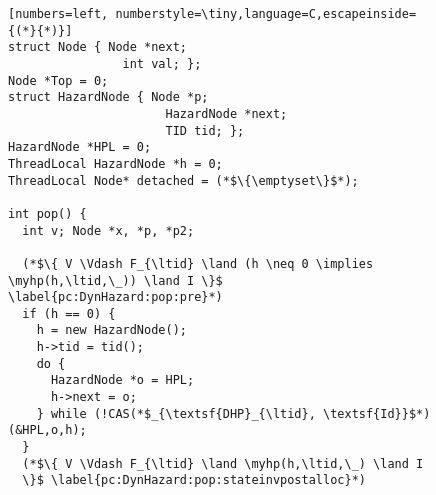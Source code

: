 \begin{figure}[p]
{\figfontsize
\begin{lstlisting}[numbers=left, numberstyle=\tiny,language=C,escapeinside={(*}{*)}]
struct Node { Node *next;
                int val; };
Node *Top = 0;
struct HazardNode { Node *p;
                      HazardNode *next;  
                      TID tid; };
HazardNode *HPL = 0;
ThreadLocal HazardNode *h = 0; 
ThreadLocal Node* detached = (*$\{\emptyset\}$*);

int pop() {
  int v; Node *x, *p, *p2;  

  (*$\{ V \Vdash F_{\ltid} \land (h \neq 0 \implies \myhp(h,\ltid,\_)) \land I \}$ \label{pc:DynHazard:pop:pre}*) 
  if (h == 0) {
    h = new HazardNode();
    h->tid = tid();
    do {
      HazardNode *o = HPL;
      h->next = o;
    } while (!CAS(*$_{\textsf{DHP}_{\ltid}, \textsf{Id}}$*)(&HPL,o,h);
  }
  (*$\{ V \Vdash F_{\ltid} \land \myhp(h,\ltid,\_) \land I
  \}$ \label{pc:DynHazard:pop:stateinvpostalloc}*) 


\end{lstlisting}}
\end{figure}
